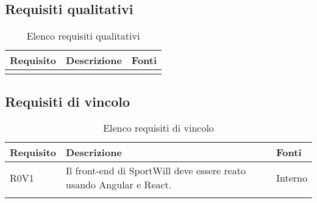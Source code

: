 \subsection{Requisiti qualitativi}
\begin{center}
\begin{longtable}{|p{3cm}|p{8cm}|p{3cm}|}
\hline
\rowcolor{lighter-grayer}
\textbf{Requisito}&\textbf{Descrizione}&\textbf{Fonti}\\ \hline

\caption{Elenco requisiti qualitativi}
\end{longtable}
\end{center}
\newpage
\subsection{Requisiti di vincolo}
\begin{center}
\begin{longtable}{|p{3cm}|p{8cm}|p{3cm}|}
\hline
\rowcolor{lighter-grayer}
\textbf{Requisito}&\textbf{Descrizione}&\textbf{Fonti}\\ 
\hline
R0V1 & Il front-end di SportWill deve essere reato usando Angular e React.& Interno\\
\hline

\caption{Elenco requisiti di vincolo}
\end{longtable}
\end{center}